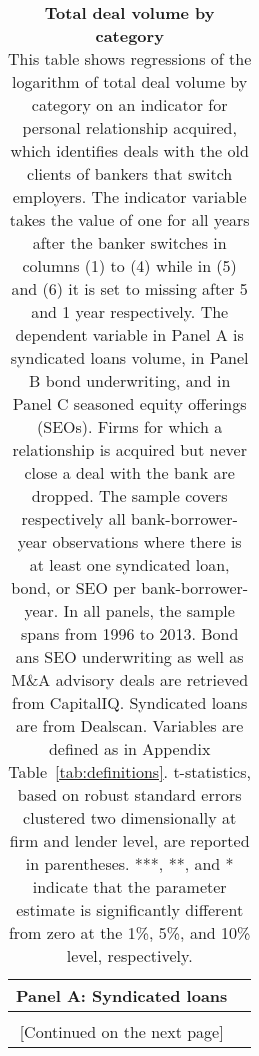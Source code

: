 \begin{table}[H] \begin{center} 
	\caption{\textbf{Total deal volume by category} \\ This table shows regressions of the logarithm of total deal volume by category on an indicator for personal relationship acquired, which identifies deals with the old clients of bankers that switch employers. The indicator variable takes the value of one for all years after the banker switches in columns (1) to (4) while in (5) and (6) it is set to missing after 5 and 1 year respectively. The dependent variable in Panel A is syndicated loans volume, in Panel B bond underwriting, and in Panel C seasoned equity offerings (SEOs). Firms for which a relationship is acquired but never close a deal with the bank are dropped. The sample covers respectively all bank-borrower-year observations where there is at least one syndicated loan, bond, or SEO per bank-borrower-year. In all panels, the sample spans from 1996 to 2013. Bond ans SEO underwriting as well as M\&A advisory deals are retrieved from CapitalIQ. Syndicated loans are from Dealscan. Variables are defined as in Appendix Table~\ref{tab:definitions}. t-statistics, based on robust standard errors clustered two dimensionally at firm and lender level, are reported in parentheses. ***, **, and * indicate that the parameter estimate is significantly different from zero at the 1\%, 5\%, and 10\% level, respectively. } 
		\label{tab:main_dealsize_categ} 
	\begin{threeparttable} 
		\begin{tabular*}{\hsize}{@{\hskip\tabcolsep\extracolsep\fill}l*{6}{c}}
			\multicolumn{6}{l}{\textbf{Panel A}: Syndicated loans} \\
			\toprule  
				\def\sym#1{\ifmmode^{#1}\else\(^{#1}\)\fi}
				  
			\bottomrule \\  \multicolumn{6}{c}{[Continued on the next page]}  \end{tabular*}
			\end{threeparttable}   \end{center} \end{table}
\newpage
